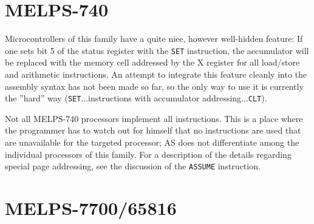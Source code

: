 \documentclass[12pt,twoside]{report}
\newcommand{\tty}[1]{{\tt #1}}
\begin{document}
\section{MELPS-740}

Microcontrollers of this family have a quite nice, however well-hidden
feature: If one sets bit 5 of the status register with the \tty{SET}
instruction, the accumulator will be replaced with the memory cell
addressed by the X register for all load/store and arithmetic
instructions.  An attempt to integrate this feature cleanly into the
assembly syntax has not been made so far, so the only way to use it
is currently the ''hard'' way (\tty{SET}...instructions with accumulator
addressing...\tty{CLT}).

Not all MELPS-740 processors implement all instructions.  This is a
place where the programmer has to watch out for himself that no
instructions are used that are unavailable for the targeted
processor; AS does not differentiate among the individual processors
of this family.  For a description of the details regarding special
page addressing, see the discussion of the \tty{ASSUME} instruction.


\section{MELPS-7700/65816}
\label{MELPS7700Spec}
\end{document}
